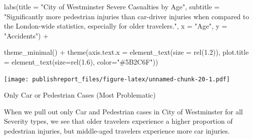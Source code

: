 \documentclass[
]{article}
\newenvironment{Shaded}{\begin{snugshade}}{\end{snugshade}}
\newcommand{\AttributeTok}[1]{\textcolor[rgb]{0.77,0.63,0.00}{#1}}
\newcommand{\FloatTok}[1]{\textcolor[rgb]{0.00,0.00,0.81}{#1}}
\newcommand{\FunctionTok}[1]{\textcolor[rgb]{0.00,0.00,0.00}{#1}}
\newcommand{\NormalTok}[1]{#1}
\newcommand{\SpecialCharTok}[1]{\textcolor[rgb]{0.00,0.00,0.00}{#1}}
\newcommand{\StringTok}[1]{\textcolor[rgb]{0.31,0.60,0.02}{#1}}
\begin{document}
\begin{Shaded}
\begin{Highlighting}[]
    \FunctionTok{labs}\NormalTok{(}\AttributeTok{title =} \StringTok{"City of Westminster Severe Casualties by Age"}\NormalTok{,}
         \AttributeTok{subtitle =} \StringTok{"Significantly more pedestrian injuries than car{-}driver injuries when compared to the London{-}wide statistics, especially for older travelers."}\NormalTok{,}
         \AttributeTok{x =} \StringTok{"Age"}\NormalTok{,}
         \AttributeTok{y =} \StringTok{"Accidents"}\NormalTok{) }\SpecialCharTok{+}
    
    \FunctionTok{theme\_minimal}\NormalTok{() }\SpecialCharTok{+}
    \FunctionTok{theme}\NormalTok{(}\AttributeTok{axis.text.x =} \FunctionTok{element\_text}\NormalTok{(}\AttributeTok{size =} \FunctionTok{rel}\NormalTok{(}\FloatTok{1.2}\NormalTok{)),}
          \AttributeTok{plot.title =} \FunctionTok{element\_text}\NormalTok{(}\AttributeTok{size=}\FunctionTok{rel}\NormalTok{(}\FloatTok{1.6}\NormalTok{), }\AttributeTok{color=}\StringTok{"\#5B2C6F"}\NormalTok{))}
\end{Highlighting}
\end{Shaded}

\texttt{[image: publishreport\_files/figure-latex/unnamed-chunk-20-1.pdf]}

Only Car or Pedestrian Cases (Most Problematic)

When we pull out only Car and Pedestrian cases in City of Westminster
for all Severity types, we see that older travelers experience a higher
proportion of pedestrian injuries, but middle-aged travelers experience
more car injuries.
\end{document}
